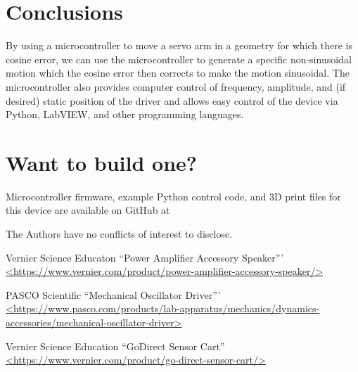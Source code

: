 \documentclass[prb,preprint]{revtex4-1}
\begin{document}
\section{Conclusions}
By using a microcontroller to move a servo arm in a geometry for which there is cosine error, we can use the microcontroller to generate a specific non-sinusoidal motion which the cosine error then corrects to make the motion sinusoidal.
The microcontroller also provides computer control of frequency, amplitude, and (if desired) static position of the driver and allows easy control of the device via Python, LabVIEW, and other programming languages.

\section{Want to build one?}
Microcontroller firmware, example Python control code, and 3D print files for this device are available on GitHub at  %

The Authors have no conflicts of interest to disclose.

\begin{thebibliography}{3}
 Vernier Science Educaton ``Power Amplifier Accessory Speaker''' \url{<https://www.vernier.com/product/power-amplifier-accessory-speaker/>}

 PASCO Scientific ``Mechanical Oscillator Driver''' \url{<https://www.pasco.com/products/lab-apparatus/mechanics/dynamics-accessories/mechanical-oscillator-driver>}

 Vernier Science Education ``GoDirect Sensor Cart'' \url{<https://www.vernier.com/product/go-direct-sensor-cart/>}

\end{thebibliography}
\end{document}
